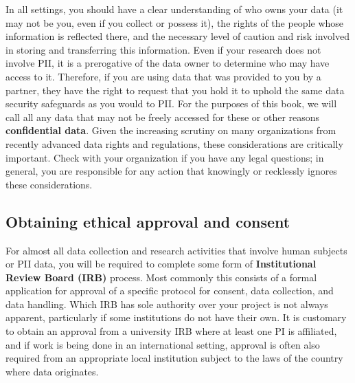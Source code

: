 In all settings, you should have a clear understanding of
who owns your data (it may not be you, even if you collect or possess it),
the rights of the people whose information is reflected there,
and the necessary level of caution and risk involved in
storing and transferring this information.
Even if your research does not involve PII,
it is a prerogative of the data owner to determine who may have access to it.
Therefore, if you are using data that was provided to you by a partner,
they have the right to request that you hold it to uphold the same data security safeguards as you would to PII.
For the purposes of this book, 
we will call all any data that may not be freely accessed for these or other reasons \textbf{confidential data}.
Given the increasing scrutiny on many organizations
from recently advanced data rights and regulations,
these considerations are critically important.
Check with your organization if you have any legal questions;
in general, you are responsible for any action that
knowingly or recklessly ignores these considerations.

\subsection{Obtaining ethical approval and consent}

For almost all data collection and research activities that involve
human subjects or PII data,
you will be required to complete some form of \textbf{Institutional Review Board (IRB)} process.
Most commonly this consists of a formal application for approval of a specific
protocol for consent, data collection, and data handling.
Which IRB has sole authority over your project is not always apparent,
particularly if some institutions do not have their own.
It is customary to obtain an approval from a university IRB
where at least one PI is affiliated,
and if work is being done in an international setting,
approval is often also required
from an appropriate local institution subject to the laws of the country where data originates.

